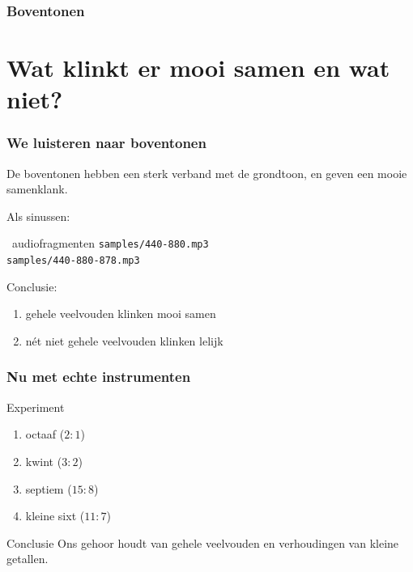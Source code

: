 \documentclass[compress, darktitle, framenumber, totalframenumber]{beamer}
\begin{document}
\begin{frame}
  \frametitle{Boventonen}

  \centering
\end{frame}


\section{Wat klinkt er mooi samen en wat niet?}

\begin{frame}
  \frametitle{We luisteren naar boventonen}

  De boventonen hebben een sterk verband met de grondtoon, en geven een mooie samenklank.

  \pause

  Als sinussen:
  \begin{block}{\twonotes\ audiofragmenten}
    \texttt{samples/440-880.mp3} \\
    \texttt{samples/440-880-878.mp3} \\
  \end{block}

  \pause
  Conclusie:
  \begin{enumerate}
    \item gehele veelvouden klinken mooi samen
    \item n\'et niet gehele veelvouden klinken lelijk
  \end{enumerate}
\end{frame}

\begin{frame}
  \frametitle{Nu met echte instrumenten}

  \begin{block}{Experiment}
    \begin{enumerate}
      \item octaaf ($2:1$)
        \pause
      \item kwint ($3:2$)
        \pause
      \item septiem ($15:8$)
        \pause
      \item kleine sixt ($11:7$)
    \end{enumerate}
  \end{block}

  \pause

  \begin{alertblock}{Conclusie}
    Ons gehoor houdt van gehele veelvouden en verhoudingen van kleine getallen.
  \end{alertblock}
\end{frame}
\end{document}
